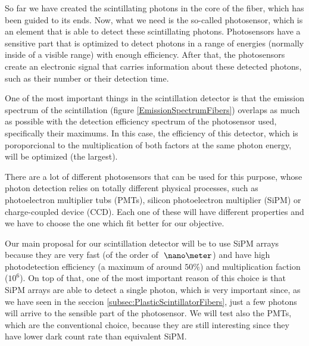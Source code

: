So far we have created the scintillating photons in the core of the fiber, which has been guided to its ends. Now, what we need is the so-called photosensor, which is an element that is able to detect these scintillating photons. Photosensors have a sensitive part that is optimized to detect photons in a range of energies (normally inside of a visible range) with enough efficiency. After that, the photosensors create an electronic signal that carries information about these detected photons, such as their number or their detection time.

One of the most important things in the scintillation detector is that the emission spectrum of the scintillation (figure \ref{EmissionSpectrumFibers}) overlaps as much as possible with the detection efficiency spectrum of the photosensor used, specifically their maximums. In this case, the efficiency of this detector,  which is poroporcional to the multiplication of both factors at the same photon energy, will be optimized (the largest).

There are a lot of different photosensors that can be used for this purpose, whose photon detection relies on totally different physical processes, such as photoelectron multiplier tubs (PMTs), silicon photoelectron multiplier (SiPM) or charge-coupled device (CCD).  Each one of these will have different properties and we have to choose the one which fit better for our objective.

Our main proposal for our scintillation detector will be to use SiPM arrays because they are very fast (of the order of $~\nano\meter$) and have high photodetection efficiency (a maximum of around $50\%$) and multiplication faction ($10^{6}$). On top of that, one of the most important reason of this choice is that SiPM arrays are able to detect a single photon, which is very important since, as we have seen in the seccion \ref{subsec:PlasticScintillatorFibers}, just a few photons will arrive to the sensible part of the photosensor. We will test also the PMTs, which are the conventional choice, because they are still interesting since they have lower dark count rate than equivalent SiPM.







